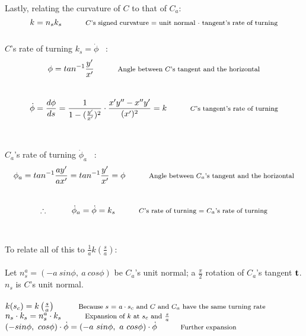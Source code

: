 \documentclass[12pt]{article}
\begin{document}
Lastly, relating the curvature of $C$ to that of $C_a$:\\
$$k = n_sk_s \hspace{1cm}\textrm{{\footnotesize $C$'s signed curvature = unit normal $\cdot$ tangent's rate of turning}}$$\\
\footnotesize{$C$'s rate of turning $k_s = \dot\phi$ \ :}
\normalsize
$$\phi = tan^{-1}\frac{y'}{x'} \hspace{1cm}\textrm{{\footnotesize Angle between $C$'s tangent and the horizontal}}$$\\
$$\dot\phi = \frac{d\phi}{ds} = \frac{1}{1-(\frac{y'}{x'})^2} \cdot \frac{x'y'' - x''y'}{(x')^2} = k \hspace{1cm}\textrm{\footnotesize{$C$'s tangent's rate of turning}}$$\\
\\
{\footnotesize $C_a$'s rate of turning $\dot\phi_a$ \ :}
$$\phi_a = tan^{-1}\frac{ay'}{ax'} = tan^{-1}\frac{y'}{x'} = \phi \hspace{1cm}\textrm{\footnotesize{Angle between $C_a$'s tangent and the horizontal}}$$\\
$$\therefore \hspace{1cm} \dot\phi_a = \dot\phi = k_s \hspace{1cm}\textrm{\footnotesize{$C$'s rate of turning = $C_a$'s rate of turning}}$$
\\
\\
\normalsize
To relate all of this to $\frac{1}{a}k(\frac{s}{a})$:\\
\\
Let $n_s^a = (-a \ sin\phi, \ a\ cos\phi)$ be $C_a$'s unit normal; a $\frac{\pi}{2}$ rotation of $C_a$'s tangent $\bold{t}$.\\
$n_s$ is $C$'s unit normal.\\
\\
$ k(s_c) = k\left( \frac{s}{a} \right) \hspace{1cm}\textrm{{\footnotesize Because $s$ = $a \cdot s_c$ and $C$ and $C_a$ have the same turning rate}} $\\

$n_s \cdot k_s = n_s^a \cdot k_s \hspace{1cm}\textrm{{\footnotesize Expansion of $k$ at $s_c$ and $\frac{s}{a}$}}$\\

$ (-sin\phi, \ cos\phi) \cdot \dot\phi = (-a \ sin\phi, \ a \ cos\phi) \cdot \dot\phi \hspace{1cm}\textrm{{\footnotesize Further expansion}}$\\
\end{document}
